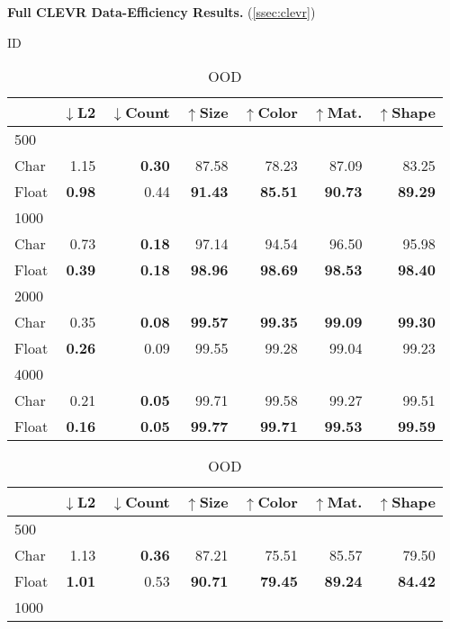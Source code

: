 \begin{table}
\centering
\caption{\textbf{Full CLEVR Data-Efficiency Results.} (\cref{ssec:clevr})}
\begin{subtable}[h]{0.495\linewidth}
\centering
\caption{ID}
{
\setlength{\tabcolsep}{2pt}
\begin{tabular}{lrrrrrr}
\toprule
 & $\downarrow$L2 & $\downarrow$Count & $\uparrow$Size & $\uparrow$Color & $\uparrow$Mat. & $\uparrow$Shape \\
\midrule
500 \\
\cline{1-1}
Char & 1.15 & \textbf{0.30} & 87.58 & 78.23 & 87.09 & 83.25 \\
Float & \textbf{0.98} & 0.44 & \textbf{91.43} & \textbf{85.51} & \textbf{90.73} & \textbf{89.29} \\
\hline
1000 \\
\cline{1-1}
Char & 0.73 & \textbf{0.18} & 97.14 & 94.54 & 96.50 & 95.98 \\
Float & \textbf{0.39} & \textbf{0.18} & \textbf{98.96} & \textbf{98.69} & \textbf{98.53} & \textbf{98.40} \\
\hline
2000 \\
\cline{1-1}
Char & 0.35 & \textbf{0.08} & \textbf{99.57} & \textbf{99.35} & \textbf{99.09} & \textbf{99.30} \\
Float & \textbf{0.26} & 0.09 & 99.55 & 99.28 & 99.04 & 99.23 \\
\hline
4000 \\
\cline{1-1}
Char & 0.21 & \textbf{0.05} & 99.71 & 99.58 & 99.27 & 99.51 \\
Float & \textbf{0.16} & \textbf{0.05} & \textbf{99.77} & \textbf{99.71} & \textbf{99.53} & \textbf{99.59} \\
\bottomrule
\end{tabular}
}
\label{table:clevr_efficiency_id}
\end{subtable}
\begin{subtable}[h]{0.495\linewidth}
\centering
\caption{OOD}
{
\setlength{\tabcolsep}{2pt}
\begin{tabular}{lrrrrrr}
\toprule
& $\downarrow$L2 & $\downarrow$Count & $\uparrow$Size & $\uparrow$Color & $\uparrow$Mat. & $\uparrow$Shape \\
\midrule
500 \\
\cline{1-1}
Char & 1.13 & \textbf{0.36} & 87.21 & 75.51 & 85.57 & 79.50 \\
Float & \textbf{1.01} & 0.53 & \textbf{90.71} & \textbf{79.45} & \textbf{89.24} & \textbf{84.42} \\
\hline
1000 \\

\end{tabular}}
\end{subtable}
\end{table}
